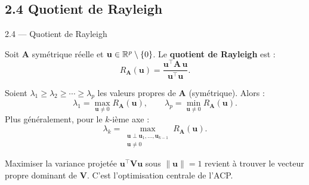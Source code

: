 \subsection{2.4 Quotient de Rayleigh}
\begin{frame}{2.4 — Quotient de Rayleigh}
\begin{definition}
Soit $\mathbf{A}$ symétrique réelle et $\mathbf{u} \in \mathbb{R}^p \setminus \{0\}$. Le
\textbf{quotient de Rayleigh} est :
\[
R_{\mathbf{A}}(\mathbf{u}) = \frac{\mathbf{u}^\top \mathbf{A}\, \mathbf{u}}{\mathbf{u}^\top \mathbf{u}}.
\]
\end{definition}

\begin{theorem}
Soient $\lambda_1 \geq \lambda_2 \geq \cdots \geq \lambda_p$ les valeurs propres
de $\mathbf{A}$ (symétrique). Alors :
\[
\boxed{\;\lambda_1 = \max_{\mathbf{u} \neq 0} R_{\mathbf{A}}(\mathbf{u}),
\qquad
\lambda_p = \min_{\mathbf{u} \neq 0} R_{\mathbf{A}}(\mathbf{u}).\;}
\]
Plus généralement, pour le $k$-ième axe :
\[
\lambda_k = \max_{\substack{\mathbf{u} \perp \mathbf{u}_1, \ldots, \mathbf{u}_{k-1} \\ \mathbf{u} \neq 0}}
R_{\mathbf{A}}(\mathbf{u}).
\]
\end{theorem}

\begin{rema}
\small Maximiser la variance projetée $\mathbf{u}^\top \mathbf{V} \mathbf{u}$ sous
$\|\mathbf{u}\|=1$ revient à trouver le \alert{vecteur propre dominant} de $\mathbf{V}$.
C'est l'optimisation centrale de l'ACP.
\end{rema}
\end{frame}

